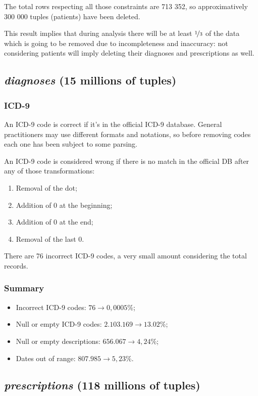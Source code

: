 The total rows respecting all those constraints are 713 352, so approximatively 300 000 tuples (patients) have been deleted. 

This result implies that during analysis there will be at least $\nicefrac{1}{3}$ of the data which is going to be removed due to incompleteness and inaccuracy: not considering patients will imply deleting their diagnoses and prescriptions as well.

\subsection{\textit{diagnoses} (15 millions of tuples)}
\subsubsection{ICD-9}
An ICD-9 code is correct if it's in the official ICD-9 database\cite{icd9}. General practitioners may use different formats and notations, so before removing codes each one has been subject to some parsing.

An ICD-9 code is considered wrong if there is no match in the official DB after any of those transformations:
\begin{enumerate}
	\item Removal of the dot;
	\item Addition of 0 at the beginning;
	\item Addition of 0 at the end;
	\item Removal of the last 0.
\end{enumerate}

There are 76 incorrect ICD-9 codes, a very small amount considering the total records.

\subsubsection{Summary}
\begin{itemize}
	\item Incorrect ICD-9 codes: $76 \rightarrow 0,0005\%$;
	\item Null or empty ICD-9 codes: $2.103.169 \rightarrow 13.02\%$;
	\item Null or empty descriptions: $656.067 \rightarrow 4,24\%$;
	\item Dates out of range: $807.985 \rightarrow 5,23\%$.
\end{itemize}

\subsection{\textit{prescriptions} (118 millions of tuples)}
